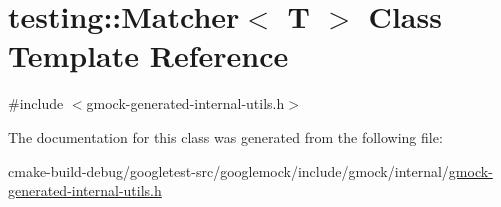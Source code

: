 \hypertarget{classtesting_1_1Matcher}{}\section{testing\+::Matcher$<$ T $>$ Class Template Reference}
\label{classtesting_1_1Matcher}


{\ttfamily \#include $<$gmock-\/generated-\/internal-\/utils.\+h$>$}



The documentation for this class was generated from the following file\+:\begin{DoxyCompactItemize}
\item 
cmake-\/build-\/debug/googletest-\/src/googlemock/include/gmock/internal/\mbox{\hyperlink{gmock-generated-internal-utils_8h}{gmock-\/generated-\/internal-\/utils.\+h}}\end{DoxyCompactItemize}
